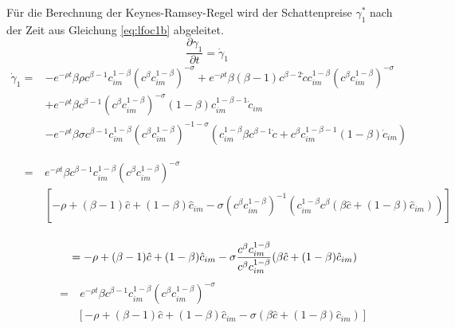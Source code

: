 Für die Berechnung der Keynes-Ramsey-Regel wird der Schattenpreise $\gamma_1^*$ nach der Zeit  aus Gleichung \eqref{eq:lfoc1b} abgeleitet.
\begin{equation}\frac{\partial\gamma_1}{\partial t} = \dot{\gamma}_{1}\end{equation}
\begin{equation*}
\begin{split}
		\dot{\gamma}_{1} = &-e^{-\rho t} \beta \rho c^{\beta -1} c_{im}^{1- \beta} (c^{\beta} c_{im}^{1- \beta})^{- \sigma} + e^{-\rho t} \beta (\beta -1 )c^{\beta -2}\dot{c}c_{im}^{1- \beta}(c^{\beta} c_{im}^{1- \beta})^{- \sigma}\\
		& + e^{- \rho t} \beta c^{\beta -1} (c^{\beta} c_{im}^{1- \beta})^{- \sigma}(1- \beta) c_{im}^{1- \beta -1} \dot{c}_{im}\\
		&- e^{- \rho t} \beta \sigma c^{\beta -1} c_{im}^{1- \beta} (c^{\beta} c_{im}^{1- \beta})^{-1- \sigma} (c_{im}^{1- \beta} \beta c^{\beta -1} \dot{c} + c^{\beta} c_{im}^{1- \beta -1}(1- \beta) \dot{c}_{im})
\end{split}
\end{equation*}

\begin{equation*}
\begin{split}
	~\quad = ~& e^{- \rho t} \beta c^{\beta -1} c_{im}^{1- \beta} (c^{\beta} c_{im}^{1- \beta})^{- \sigma} \\
		&\left [ - \rho + (\beta -1)\hat{c}+(1-\beta)\hat{c}_{im} - \sigma (c^{\beta} c_{im}^{1- \beta})^{-1} (c_{im}^{1- \beta} c^{\beta} (\beta \hat{c} + (1- \beta) \hat{c}_{im})) \right]\\
\end{split}
\end{equation*}


\begin{equation*}
		~\quad = - \rho + (\beta - 1) \hat{c} + (1- \beta) \hat{c}_{im} - \sigma \frac{c^{ \beta} c_{im}^{1- \beta}} {c^{\beta} c_{im}^{1- \beta}} (\beta \hat{c} + (1- \beta) \hat{c}_{im})\\
\end{equation*}
\begin{equation*}
\begin{split}
			\quad~ = &~ e^{- \rho t} \beta c^{\beta -1} c_{im}^{1- \beta} (c^{\beta} c_{im}^{1- \beta} )^{- \sigma}\\
		&\left [ - \rho + (\beta-1) \hat{c} + (1- \beta) \hat{c}_{im} - \sigma (\beta \hat{c} + (1- \beta) \hat{c}_{im}) \right ]\\
\end{split}
\end{equation*}


